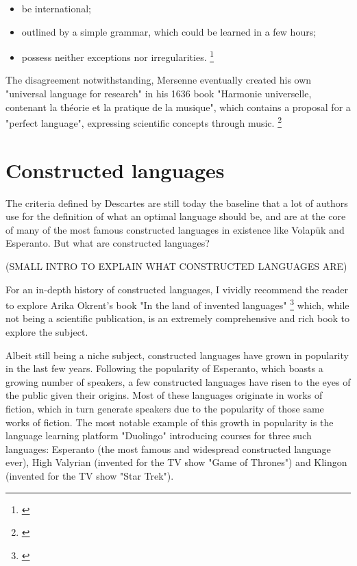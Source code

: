 \begin{itemize}
    \setlength\itemsep{-0.5em}
    \item be international;
    \item outlined by a simple grammar, which could be learned in a few hours;
    \item possess neither exceptions nor irregularities. \footnote{\cite[76-82]{descartes1897oeuvres}}
\end{itemize}

The disagreement notwithstanding, Mersenne eventually created his own "universal language for research" in his 1636 book "Harmonie universelle, contenant la th{\'e}orie et la pratique
de la musique", which contains a proposal for a "perfect language", expressing scientific concepts through music. \footnote{\cite[Book I, proposition 24]{mersenne1636}}

\section{Constructed languages}

The criteria defined by Descartes are still today the baseline that a lot of authors use for the definition of what an optimal language should be, and are at the core of many of the most
famous constructed languages in existence like Volapük and Esperanto. But what are constructed languages?\newline

(SMALL INTRO TO EXPLAIN WHAT CONSTRUCTED LANGUAGES ARE) \newline

For an in-depth history of constructed languages, I vividly recommend the reader to explore Arika Okrent's book "In the land of invented languages" \footnote{\cite{okrent2009land}} which,
while not being a scientific publication, is an extremely comprehensive and rich book to explore the subject.\newline

Albeit still being a niche subject, constructed languages have grown in popularity in the last few years. Following the popularity of Esperanto, which boasts a growing
number of speakers, a few constructed languages have risen to the eyes of the public given their origins. Most of these languages originate in works of fiction,
which in turn generate speakers due to the popularity of those same works of fiction. The most notable example of this growth in popularity is the language learning
platform "Duolingo" introducing courses for three such languages: Esperanto (the most famous and widespread constructed language ever), High Valyrian (invented for the TV show
"Game of Thrones") and Klingon (invented for the TV show "Star Trek"). \newline

